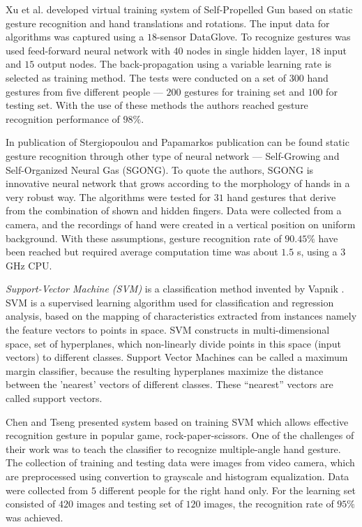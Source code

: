 Xu et al. \cite{conf/icat/XuYZ06} developed virtual training system of Self-Propelled Gun based on static gesture recognition and hand translations and rotations. The input data for algorithms was captured using a $18$-sensor DataGlove. To recognize gestures was used feed-forward neural network with $40$ nodes in single hidden layer, $18$ input and $15$ output nodes. The back-propagation using a variable learning rate is selected as training method. The tests were conducted on a set of $300$ hand gestures from five different people --- $200$ gestures for training set and $100$ for testing set. With the use of these methods the authors reached gesture recognition performance of $98\%$.

In publication of Stergiopoulou and Papamarkos publication \cite {Stergiopoulou:2009:HGR:1651923.1651954} can be found static gesture recognition through other type of neural network --- Self-Growing and Self-Organized Neural Gas (SGONG). To quote the authors, SGONG is innovative neural network that grows according to the morphology of hands in a very robust way. The algorithms were tested for $31$ hand gestures that derive from the combination of shown and hidden fingers. Data were collected from a camera, and the recordings of hand were created in a vertical position on uniform background. With these assumptions, gesture recognition rate of $90.45\%$ have been reached but required average computation time was about $1.5$ s, using a $3$ GHz CPU.

\emph{Support-Vector Machine (SVM)} is a classification method invented by Vapnik \cite{Cortes:SVM}. SVM is a supervised learning algorithm used for classification and regression analysis, based on the mapping of characteristics extracted from instances namely the feature vectors to points in space. SVM constructs in multi-dimensional space, set of hyperplanes, which non-linearly divide points in this space (input vectors) to different classes. Support Vector Machines can be called a maximum margin classifier, because the resulting hyperplanes maximize the distance between the ’nearest’ vectors of different classes. These ``nearest'' vectors are called support vectors.

Chen and Tseng \cite{ChenDeveloping} presented system based on training SVM which allows effective recognition gesture in popular game, rock-paper-scissors. One of the challenges of their work was to teach the classifier to recognize multiple-angle hand gesture. The collection of training and testing data were images from video camera, which are preprocessed using convertion to grayscale and histogram equalization. Data were collected from $5$ different people for the right hand only. For the learning set consisted of $420$ images and testing set of $120$ images, the recognition rate of $95\%$ was achieved.

